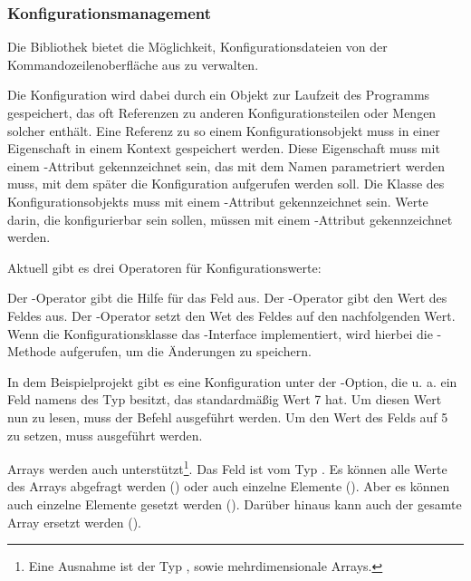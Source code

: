 \subsubsection{Konfigurationsmanagement}\label{ConfigurationManagement}
Die Bibliothek bietet die Möglichkeit, Konfigurationsdateien von der Kommandozeilenoberfläche aus zu verwalten.

Die Konfiguration wird dabei durch ein Objekt zur Laufzeit des Programms gespeichert, das oft Referenzen zu anderen Konfigurationsteilen oder Mengen solcher enthält.
Eine Referenz zu so einem Konfigurationsobjekt muss in einer Eigenschaft in einem Kontext gespeichert werden.
Diese Eigenschaft muss mit einem -Attribut gekennzeichnet sein, das mit dem Namen parametriert werden muss,
mit dem später die Konfiguration aufgerufen werden soll.
Die Klasse des Konfigurationsobjekts muss mit einem -Attribut gekennzeichnet sein.
Werte darin, die konfigurierbar sein sollen, müssen mit einem -Attribut gekennzeichnet werden.

Aktuell gibt es drei Operatoren für Konfigurationswerte:
\begin{outline}
 \1 Der -Operator gibt die Hilfe für das Feld aus.
 \1 Der -Operator gibt den Wert des Feldes aus.
 \1 Der -Operator setzt den Wet des Feldes auf den nachfolgenden Wert.
 Wenn die Konfigurationsklasse das -Interface implementiert, wird hierbei die -Methode aufgerufen, um die \"Anderungen zu speichern.
 \end{outline}

In dem Beispielprojekt gibt es eine Konfiguration unter der -Option, die u. a. ein Feld namens  des Typ  besitzt,
das standardmäßig Wert 7 hat.
Um diesen Wert nun zu lesen, muss der Befehl  ausgeführt werden.
Um den Wert des Felds auf 5 zu setzen, muss  ausgeführt werden.

Arrays werden auch unterstützt\footnote{Eine Ausnahme ist der Typ , sowie mehrdimensionale Arrays.}.
Das Feld  ist vom Typ .
Es können alle Werte des Arrays abgefragt werden ()
oder auch einzelne Elemente ().
Aber es können auch einzelne Elemente gesetzt werden ().
Darüber hinaus kann auch der gesamte Array ersetzt werden ().


